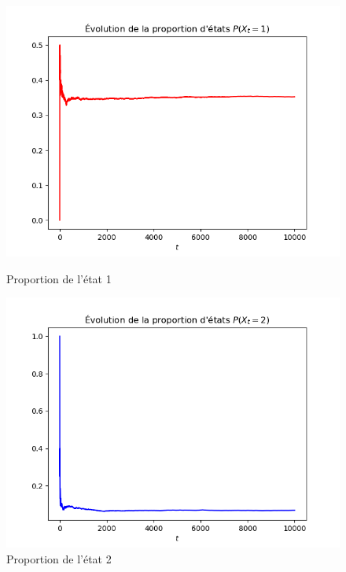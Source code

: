 \begin{figure}[!h]
  \centering
  \begin{minipage}{.5\textwidth}
    \centering
    \includegraphics[width=\linewidth]{figs/evo1.png}
    \caption{Proportion de l'état 1}
  \end{minipage}%
  \begin{minipage}{.5\textwidth}
    \centering
    \includegraphics[width=\linewidth]{figs/evo2.png}
    \caption{Proportion de l'état 2}
  \end{minipage}
\end{figure}

